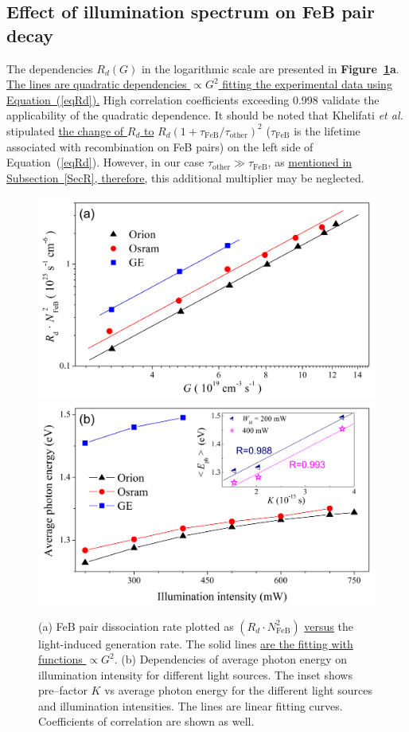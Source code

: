 \documentclass{WileyMSP-template}
\begin{document}
\subsection{Effect of illumination spectrum on FeB pair decay}\label{SecLast}

The dependencies $R_d (G)$ in the logarithmic scale are presented in \textbf{Figure~\ref{fig6}a}.
\textcolor[rgb]{0.00,0.07,1.00}{\uline{The lines are quadratic dependencies $\propto G^2$ fitting the experimental data using Equation~(\ref{eqRd}).}}
High correlation coefficients exceeding 0.998 validate the applicability of the quadratic dependence.
It should be noted that Khelifati \emph{et al.} \cite{FeBKin2019} stipulated \textcolor[rgb]{0.00,0.07,1.00}{\uline{the change of $R_d$ to}}
$R_d\left(1+\tau_\mathrm{FeB}/\tau_\mathrm{other}\right)^2$ ($\tau_\mathrm{FeB}$ is the lifetime associated with recombination on FeB pairs)
on the left side of Equation~(\ref{eqRd}).
However, in our case $\tau_\mathrm{other}\gg \tau_\mathrm{FeB}$, as \textcolor[rgb]{0.00,0.07,1.00}{\uline{mentioned in Subsection~\ref{SecR}, therefore,}}
this additional multiplier may be neglected.


\begin{figure}
\centering
  \includegraphics[width=0.4\linewidth]{Fig6a.png}
  \includegraphics[width=0.4\linewidth]{Fig6b.png}
  \caption{
  (a) FeB pair dissociation rate plotted as $\left(R_d\cdot N_\mathrm{FeB}^2\right)$ \textcolor[rgb]{0.00,0.07,1.00}{\uline{versus}} the light-induced
  generation rate. The solid lines \textcolor[rgb]{0.00,0.07,1.00}{\uline{are the fitting with functions $\propto G^2$}}.
  (b) Dependencies of average photon energy on illumination intensity for different light sources.
  The inset shows pre--factor $K$ vs average photon energy for the different light sources and illumination intensities.
  The lines are linear fitting curves. Coefficients of correlation are shown as well.
  }
  \label{fig6}
\end{figure}
\end{document}
